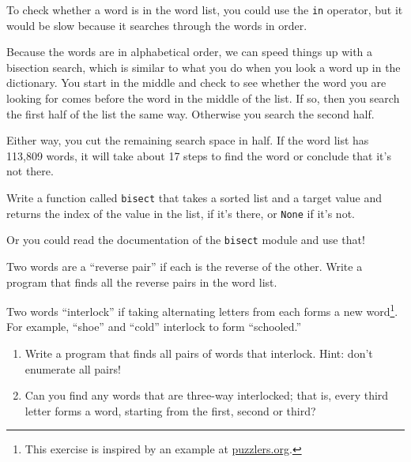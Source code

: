 \documentclass[10pt]{book}
\begin{document}
\begin{ex}
\label{wordlist1}
\label{bisection}


To check whether a word is in the word list, you could use
the {\tt in} operator, but it would be slow because it searches
through the words in order.

Because the words are in alphabetical order, we can speed things up
with a bisection search, which is similar to what you do when you look
a word up in the dictionary.  You start in the middle and check to see
whether the word you are looking for comes before the word in the
middle of the list.  If so, then you search the first half of the list
the same way.  Otherwise you search the second half.

Either way, you cut the remaining search space in half.  If the
word list has 113,809 words, it will take about 17 steps to
find the word or conclude that it's not there.

Write a function called {\tt bisect} that takes a sorted list
and a target value and returns the index of the value
in the list, if it's there, or {\tt None} if it's not.


Or you could read the documentation of the {\tt bisect} module
and use that!
\end{ex}

\begin{ex}

Two words are a ``reverse pair'' if each is the reverse of the
other.  Write a program that finds all the reverse pairs in the
word list. 
\end{ex}

\begin{ex}

Two words ``interlock'' if taking alternating letters from each forms
a new word\footnote{This exercise is inspired by an example at
  \url{puzzlers.org}.}.  For example, ``shoe'' and ``cold''
interlock to form ``schooled.''

\begin{enumerate}

\item Write a program that finds all pairs of words that interlock.
  Hint: don't enumerate all pairs!

\item Can you find any words that are three-way interlocked; that is,
  every third letter forms a word, starting from the first, second or
  third?

\end{enumerate}
\end{ex}
\end{document}
